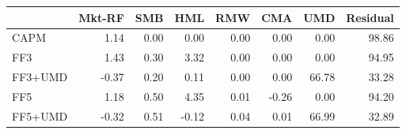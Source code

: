 \begin{tabular}{lrrrrrrr}
\toprule
 & Mkt-RF & SMB & HML & RMW & CMA & UMD & Residual \\
\midrule
CAPM & 1.14 & 0.00 & 0.00 & 0.00 & 0.00 & 0.00 & 98.86 \\
FF3 & 1.43 & 0.30 & 3.32 & 0.00 & 0.00 & 0.00 & 94.95 \\
FF3+UMD & -0.37 & 0.20 & 0.11 & 0.00 & 0.00 & 66.78 & 33.28 \\
FF5 & 1.18 & 0.50 & 4.35 & 0.01 & -0.26 & 0.00 & 94.20 \\
FF5+UMD & -0.32 & 0.51 & -0.12 & 0.04 & 0.01 & 66.99 & 32.89 \\
\bottomrule
\end{tabular}
